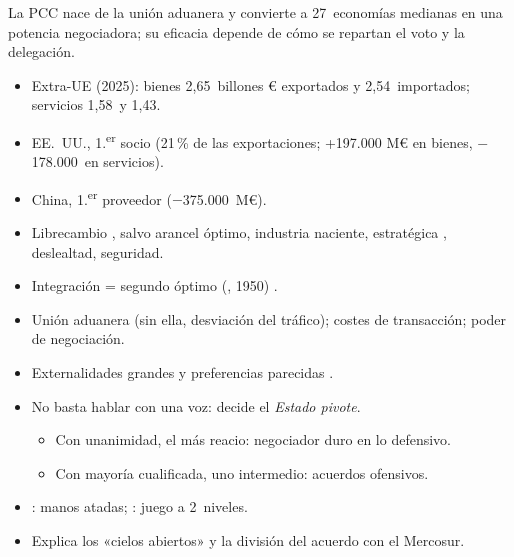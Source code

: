 \documentclass{article}
\begin{document}
\begin{columnas}
\begin{ideaclave}
La PCC nace de la unión aduanera y convierte a 27~economías medianas en una potencia negociadora; su eficacia depende de cómo se repartan el voto y la delegación.
\end{ideaclave}

\begin{itemize}
\item Extra-UE (2025): bienes 2,65~billones € exportados y 2,54~importados; servicios 1,58~y 1,43.
\item EE.~UU., 1.\textsuperscript{er} socio (21\,\% de las exportaciones; +197.000 M€ en bienes, $-$178.000~en servicios).
\item China, 1.\textsuperscript{er} proveedor ($-$375.000~M€).
\end{itemize}

\begin{itemize}
\item Librecambio  , salvo arancel óptimo, industria naciente, estratégica  , deslealtad, seguridad.
\item Integración = segundo óptimo (, 1950) .
\end{itemize}
\begin{itemize}
\item Unión aduanera (sin ella, desviación del tráfico); costes de transacción; poder de negociación.
\item Externalidades grandes y preferencias parecidas .
\end{itemize}
\begin{itemize}
\item No basta hablar con una voz: decide el \emph{Estado pivote}.
  \begin{itemize}
  \item Con unanimidad, el más reacio: negociador duro en lo defensivo.
  \item Con mayoría cualificada, uno intermedio: acuerdos ofensivos.
  \end{itemize}
\item {}: manos atadas; : juego a 2~niveles.
\item Explica los «cielos abiertos» y la división del acuerdo con el Mercosur.
\end{itemize}


\end{columnas}
\end{document}
